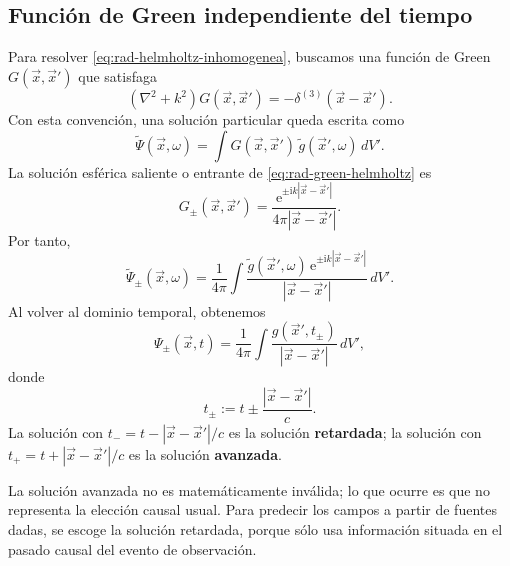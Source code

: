 \documentclass[12pt,a4paper]{article}
\theoremstyle{definition}
\theoremstyle{plain}
\numberwithin{equation}{section}
\theoremstyle{remark}
\newcommand{\ii}{\mathrm{i}}
\newcommand{\ee}{\mathrm{e}}
\begin{document}
\subsection{Función de Green independiente del tiempo}
\label{subsec:green-helmholtz-retardada}

Para resolver \eqref{eq:rad-helmholtz-inhomogenea}, buscamos una función de Green $G(\vec x,\vec x')$ que satisfaga
\begin{equation}
    \left(\nabla^2+k^2\right)G(\vec x,\vec x')
    =-\delta^{(3)}(\vec x-\vec x').
    \label{eq:rad-green-helmholtz}
\end{equation}
Con esta convención, una solución particular queda escrita como
\begin{equation}
    \widetilde\Psi(\vec x,\omega)=
    \int G(\vec x,\vec x')\,\widetilde g(\vec x',\omega)\,dV'.
    \label{eq:rad-solucion-green-frecuencia}
\end{equation}
La solución esférica saliente o entrante de \eqref{eq:rad-green-helmholtz} es
\begin{equation}
    G_{\pm}(\vec x,\vec x')=
    \frac{\ee^{\pm \ii k |\vec x-\vec x'|}}{4\pi |\vec x-\vec x'|}.
    \label{eq:rad-green-pm}
\end{equation}
Por tanto,
\begin{equation}
    \widetilde\Psi_{\pm}(\vec x,\omega)=
    \frac{1}{4\pi}\int
    \frac{\widetilde g(\vec x',\omega)\,\ee^{\pm \ii k |\vec x-\vec x'|}}
    {|\vec x-\vec x'|}\,dV'.
    \label{eq:rad-psi-frecuencia-pm}
\end{equation}
Al volver al dominio temporal, obtenemos
\begin{equation}
    \Psi_{\pm}(\vec x,t)=
    \frac{1}{4\pi}\int
    \frac{g(\vec x',t_{\pm})}{|\vec x-\vec x'|}\,dV',
    \label{eq:rad-solucion-pm-temporal}
\end{equation}
donde
\begin{equation}
    t_{\pm}:=t\pm\frac{|\vec x-\vec x'|}{c}.
    \label{eq:rad-tiempo-pm}
\end{equation}
La solución con $t_-=t-|\vec x-\vec x'|/c$ es la solución \textbf{retardada}; la solución con $t_+=t+|\vec x-\vec x'|/c$ es la solución \textbf{avanzada}.

\begin{cuidado}
La solución avanzada no es matemáticamente inválida; lo que ocurre es que no representa la elección causal usual. Para predecir los campos a partir de fuentes dadas, se escoge la solución retardada, porque sólo usa información situada en el pasado causal del evento de observación.
\end{cuidado}
\end{document}
